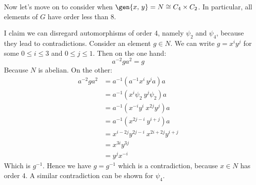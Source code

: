 Now let's move on to consider when \(\gen{x,\,y} = N \cong C_4 \times C_2\).
In particular, all elements of \(G\) have order less than 8.

I claim we can disregard automorphisms of order 4, namely \(\psi_2\) and \(\psi_4\), because they lead to contradictions.
Consider an element \(g \in N\).
We can write \(g = x^i y^j\) for some \(0 \leqslant i \leqslant 3\) and \(0 \leqslant j \leqslant 1\).
Then on the one hand:
\[a^{-2}ga^2 = g\]
Because \(N\) is abelian.
On the other:
\begin{align*}
    a^{-2}ga^2 &= a^{-1}(a^{-1}x^i\,y^j a)a \\
    &= a^{-1}(x^i\psi_2\ y^j\psi_2)a \\
    &= a^{-1}(x^{-i}y^i\ x^{2j}y^j)a \\
    &= a^{-1}(x^{2j-i}\ y^{i+j})a \\
    &= x^{i-2j}y^{2j-i}\ x^{2i+2j}y^{i+j} \\
    &= x^{3i}y^{3j} \\
    &= y^j x^{-i}
\end{align*}
Which is \(g^{-1}\).
Hence we have \(g = g^{-1}\) which is a contradiction, because \(x \in N\) has order 4.
A similar contradiction can be shown for \(\psi_4\).

